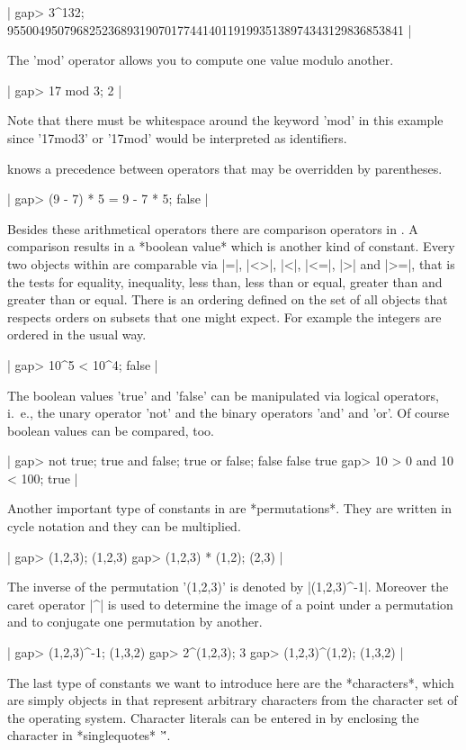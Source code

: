|    gap> 3^132;
    955004950796825236893190701774414011919935138974343129836853841 |

The 'mod' operator allows you to compute one value modulo another.

|    gap> 17 mod 3;
    2 |

Note that  there  must be  whitespace  around  the  keyword 'mod' in this
example since '17mod3' or '17mod' would be interpreted as  identifiers.

{\GAP}  knows a  precedence  between operators that may be overridden  by
parentheses.

|    gap> (9 - 7) * 5 = 9 - 7  * 5;
    false |

Besides these  arithmetical  operators  there are comparison operators in
{\GAP}.  A comparison results in a *boolean value* which is another  kind
of constant.   Every  two  objects within {\GAP} are comparable via  |=|,
 |<>|,  |<|,  |<=|,  |>|  and  |>=|,  that  is  the  tests  for equality,
inequality, less than, less than  or equal, greater than and greater than
or equal.  There is an ordering  defined on the set of all {\GAP} objects
that  respects orders on subsets that one  might expect.  For example the
integers are ordered in the usual way.

|    gap> 10^5 < 10^4;
    false |

The boolean values  'true' and   'false'  can be  manipulated via logical
operators, i.~e., the unary operator 'not' and the binary operators 'and'
and 'or'.  Of course boolean values can be compared, too.

|    gap> not true; true and false; true or false;
    false
    false
    true
    gap> 10 > 0 and 10 < 100;
    true |

Another important type of constants  in {\GAP}  are *permutations*.  They
are written in cycle notation and they can be multiplied.

|    gap> (1,2,3);
    (1,2,3)
    gap> (1,2,3) * (1,2);
    (2,3) |

The  inverse  of the  permutation '(1,2,3)'  is denoted by  |(1,2,3)^-1|.
Moreover the caret operator |^| is used to determine the image of a point
under a permutation and to conjugate one permutation by another.

|    gap> (1,2,3)^-1;
    (1,3,2)
    gap> 2^(1,2,3);
    3
    gap> (1,2,3)^(1,2);
    (1,3,2) |

The   last  type  of  constants  we  want  to   introduce  here  are  the
*characters*, which are simply objects in {\GAP} that represent arbitrary
characters from  the  character set  of  the operating system.  Character
literals can be entered in {\GAP} by enclosing the character in
*singlequotes* '\''.

